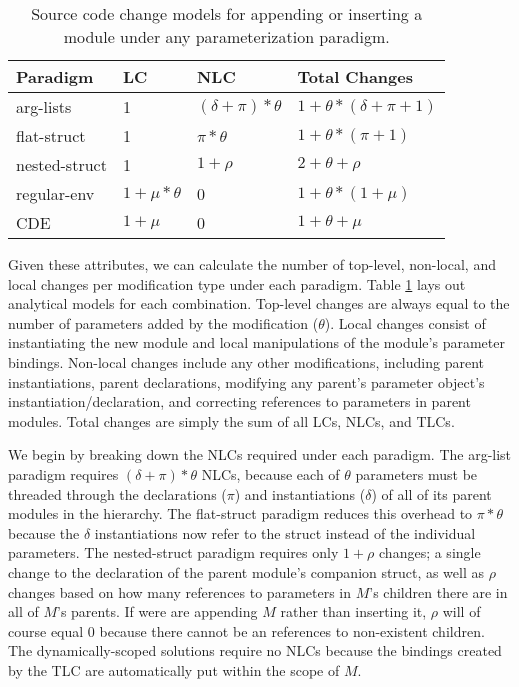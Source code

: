 \begin{table}
\centering
\begin{tabular}{llll}
\toprule
Paradigm    & LC & NLC & Total Changes\\
\midrule
arg-lists      &  1              & $(\delta+\pi)*\theta$ & $1+\theta*(\delta+\pi+1)$  \\
flat-struct    &  1              & $\pi*\theta$          & $1+\theta*(\pi+1)$  \\
nested-struct  &  1              & $1+\rho$              & $2+\theta+\rho$  \\
regular-env    &  $1+\mu*\theta$ & 0                     & $1+\theta*(1+\mu)$ \\
CDE            &  $1+\mu$        & 0                     & $1+\theta+\mu$  \\
\bottomrule
\end{tabular}
\caption{Source code change models for appending or inserting a module under any parameterization paradigm.}
\label{tab:limit}
\end{table}

Given these attributes, we can calculate the number of top-level, non-local, and local changes per modification type under each paradigm.
Table \ref{tab:limit} lays out analytical models for each combination.
Top-level changes are always equal to the number of parameters added by the modification ($\theta$).
Local changes consist of instantiating the new module and local manipulations of the module's parameter bindings.
Non-local changes include any other modifications, including parent instantiations, parent declarations, modifying any parent's parameter object's instantiation/declaration,
and correcting references to parameters in parent modules.
Total changes are simply the sum of all LCs, NLCs, and TLCs.

We begin by breaking down the NLCs required under each paradigm.
The arg-list paradigm requires $(\delta+\pi)*\theta$ NLCs, because each of $\theta$ parameters must be threaded through the declarations ($\pi$) and instantiations ($\delta$) of all of its parent modules in the hierarchy.
The flat-struct paradigm reduces this overhead to $\pi*\theta$ because the $\delta$ instantiations now refer to the struct instead of the individual parameters.
The nested-struct paradigm requires only $1+\rho$ changes; a single change to the declaration of the parent module's companion struct, as well as $\rho$ changes based on how many
references to parameters in $M$'s children there are in all of $M$'s parents.
If were are appending $M$ rather than inserting it, $\rho$ will of course equal 0 because there cannot be an references to non-existent children.
The dynamically-scoped solutions require no NLCs because the bindings created by the TLC are automatically put within the scope of $M$.

